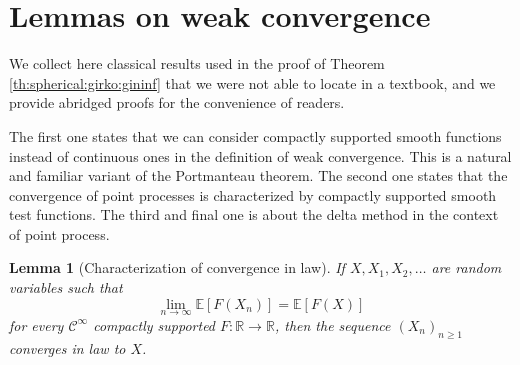 \documentclass[10pt,reqno]{amsart}
\newcommand{\<}{\langle}
\renewcommand{\>}{\rangle}
\numberwithin{equation}{section}
\newtheorem{lemma}[theorem]{Lemma}%
\begin{document}
\section{Lemmas on weak convergence}

We collect here classical results used in the proof of Theorem \ref{th:spherical:girko:gininf}
that we were not able to locate in a textbook, and we provide abridged proofs for the convenience of readers.

The first one states that we can consider compactly supported smooth functions instead of continuous ones in the definition of weak convergence. This is a natural and familiar variant of the Portmanteau theorem. The second one states that the convergence of point processes is characterized by compactly supported smooth test functions. The third and final one
is about the delta method in the context of point process.

\begin{lemma}[Characterization of convergence in law] \label{lem:WeakSmoothCompactly}
		If $X,X_1,X_2,\ldots$ are random variables such that 
		\begin{equation}
			\label{eq:limit}
			\lim_{n \to \infty} 
		\mathbb E[F(X_n)]
		= \mathbb E[F(X)]
		\end{equation}
		for every $\mathcal{C}^\infty$ compactly supported $F: \mathbb R \to \mathbb R$,
    	then the sequence ${(X_n)}_{n\geq1}$ converges in law to $X$.
\end{lemma}
	
\end{document}
